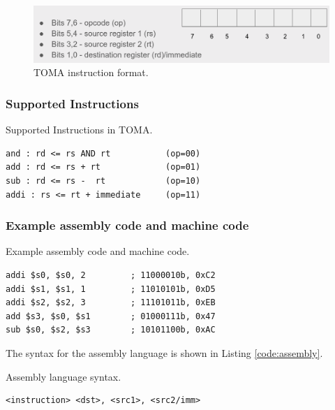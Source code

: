 \documentclass[a4paper, 11pt,oneside]{article}
\begin{document}
\begin{figure}[H]
	\begin{center}
	\includegraphics[width=4.5in]{ins_format.png}
	\caption{TOMA instruction format.}
	\label{fig:ins_format} 
	\end{center}
\end{figure}

\subsubsection{Supported Instructions}
\begin{listing}[H]
\caption{Supported Instructions in TOMA.}
\label{code:instructions}
\begin{verbatim}
and : rd <= rs AND rt           (op=00)
add : rd <= rs + rt             (op=01)
sub : rd <= rs -  rt            (op=10)
addi : rs <= rt + immediate     (op=11)
\end{verbatim}
\end{listing}


\subsubsection{Example assembly code and machine code}

\begin{listing}[H]
\caption{Example assembly code and machine code.}
\label{code:assembly}
\begin{verbatim}
addi $s0, $s0, 2         ; 11000010b, 0xC2
addi $s1, $s1, 1         ; 11010101b, 0xD5
addi $s2, $s2, 3         ; 11101011b, 0xEB
add $s3, $s0, $s1        ; 01000111b, 0x47
sub $s0, $s2, $s3        ; 10101100b, 0xAC
\end{verbatim}
\end{listing}

The syntax for the assembly language is shown in Listing \ref{code:assembly}.

\begin{listing}[H]
\caption{Assembly language syntax.}
\label{code:assembly}

\begin{verbatim}
<instruction> <dst>, <src1>, <src2/imm>
\end{verbatim}
\end{listing}
\end{document}
